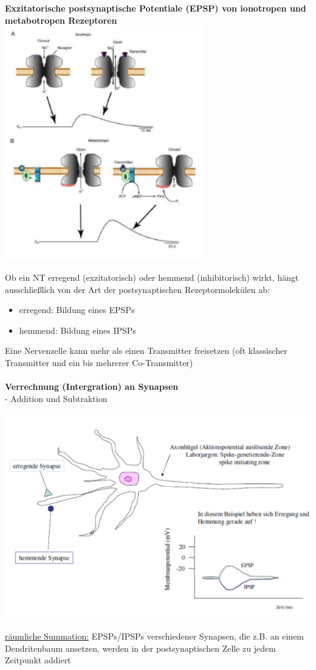 \textbf{Exzitatorische postsynaptische Potentiale (EPSP) von ionotropen und metabotropen Rezeptoren}\\
\includegraphics[width=0.65\textwidth]{lectures/160405/pix/epsp.png}

Ob ein NT erregend (exzitatorisch) oder hemmend (inhibitorisch) wirkt, hängt ausschließlich von der Art der postsynaptischen Rezeptormolekülen ab:
\begin{itemize}
	\item erregend: Bildung eines EPSPs
	\item hemmend: Bildung eines IPSPs
\end{itemize}

Eine Nervenzelle kann mehr als einen Transmitter freisetzen (oft klassischer Transmitter und ein bis mehrerer Co-Transmitter)
\\\\
\textbf{Verrechnung (Intergration) an Synapsen}\\
 - Addition und Subtraktion\\\\
\includegraphics[width=1\textwidth]{lectures/160405/pix/calculation.png}
\\\\
\underline{räumliche Summation:} EPSPs/IPSPs verschiedener Synapsen, die z.B. an einem Dendritenbaum ansetzen, werden in der postsynaptischen Zelle zu jedem Zeitpunkt addiert\\

